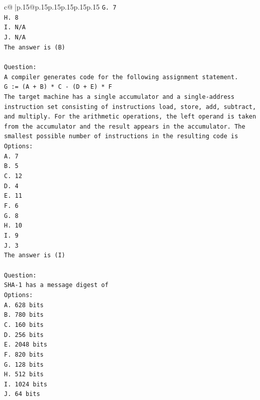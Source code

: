 \documentclass{article}
\begin{document}
{\begin{supertabular}{c@{$\;$}|p{.15\linewidth}@{}p{.15\linewidth}p{.15\linewidth}p{.15\linewidth}p{.15\linewidth}p{.15\linewidth}}
{{{\texttt{G. 7} \\
\texttt{H. 8} \\
\texttt{I. N/A} \\
\texttt{J. N/A} \\
\texttt{The answer is (B)} \\
\\ 
\texttt{Question:} \\
\texttt{A compiler generates code for the following assignment statement.} \\
\texttt{G := (A + B) * C {-} (D + E) * F} \\
\texttt{The target machine has a single accumulator and a single{-}address instruction set consisting of instructions load, store, add, subtract, and multiply. For the arithmetic operations, the left operand is taken from the accumulator and the result appears in the accumulator. The smallest possible number of instructions in the resulting code is} \\
\texttt{Options:} \\
\texttt{A. 7} \\
\texttt{B. 5} \\
\texttt{C. 12} \\
\texttt{D. 4} \\
\texttt{E. 11} \\
\texttt{F. 6} \\
\texttt{G. 8} \\
\texttt{H. 10} \\
\texttt{I. 9} \\
\texttt{J. 3} \\
\texttt{The answer is (I)} \\
\\ 
\texttt{Question:} \\
\texttt{SHA{-}1 has a message digest of} \\
\texttt{Options:} \\
\texttt{A. 628 bits} \\
\texttt{B. 780 bits} \\
\texttt{C. 160 bits} \\
\texttt{D. 256 bits} \\
\texttt{E. 2048 bits} \\
\texttt{F. 820 bits} \\
\texttt{G. 128 bits} \\
\texttt{H. 512 bits} \\
\texttt{I. 1024 bits} \\
\texttt{J. 64 bits} \\
}}}
\end{supertabular}}
\end{document}
